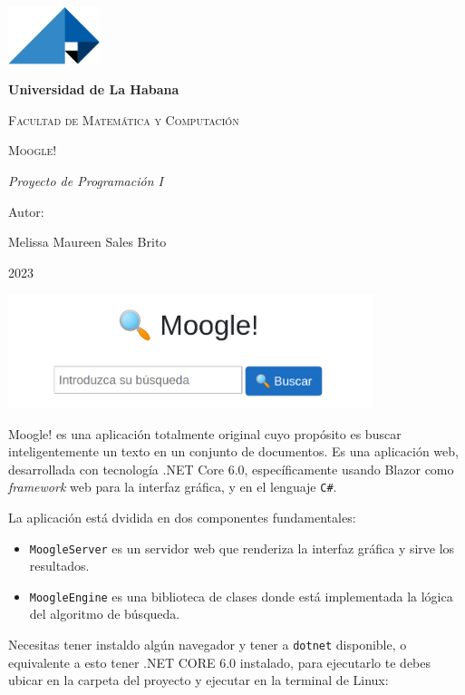 \documentclass[a4paper, 12pt]{article}
\begin{document}
\begin{titlepage}

    \centering
    {\includegraphics[width=0.2\textwidth]{logo}\par}
    \vspace{1cm}
    {\bfseries\LARGE Universidad de La Habana \par}
    \vspace{1cm}
    {\scshape\Large Facultad de Matem\'atica y Computaci\'on \par}
    \vspace{3cm}
    {\scshape\Huge Moogle! \par}
    \vspace{3cm}
    {\itshape\Large Proyecto de Programaci\'on I \par}
    \vfill
    {\Large Autor: \par}
    {\Large Melissa Maureen Sales Brito \par}
    \vfill
    {\Large 2023 \par}

\end{titlepage}

\centering
{\includegraphics[width=0.8\textwidth]{../images Readme/moogle.png}\par}
\vspace{1cm}

Moogle! es una aplicación totalmente original cuyo propósito es buscar inteligentemente un texto en un conjunto de documentos.
Es una aplicación web, desarrollada con tecnología .NET Core 6.0, específicamente usando Blazor como {\it framework} web para la interfaz gráfica, y en el lenguaje {\tt C\#}.
\vspace{0.5cm}

La aplicación está dvidida en dos componentes fundamentales:
\begin{itemize}
    \item {\tt MoogleServer} es un servidor web que renderiza la interfaz gráfica y sirve los resultados.
    \item {\tt MoogleEngine} es una biblioteca de clases donde está implementada la lógica del algoritmo de búsqueda.
\end{itemize}
\vspace{0.5cm}
Necesitas tener instaldo algún navegador y tener a {\tt dotnet} disponible, o equivalente a esto tener .NET CORE 6.0 instalado, para
ejecutarlo te debes ubicar en la carpeta del proyecto y ejecutar en la terminal de Linux:
\vspace{0.5cm}
\end{document}
